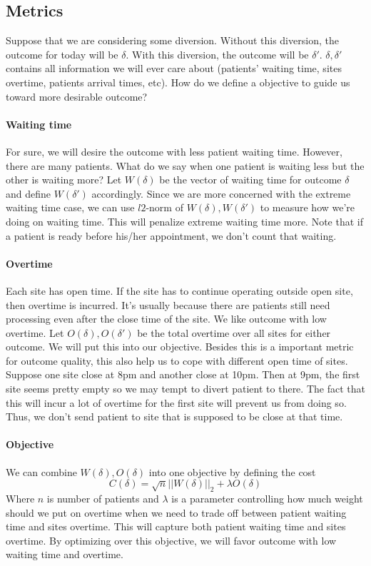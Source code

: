 \subsection{Metrics}

Suppose that we are considering some diversion. Without this diversion, the outcome for today will be $\delta$. With this diversion, the outcome will be $\delta'$. $\delta, \delta'$ contains all information we will ever care about (patients' waiting time, sites overtime, patients arrival times, etc). How do we define a objective to guide us toward more desirable outcome?

\paragraph{Waiting time} For sure, we will desire the outcome with less patient waiting time. However, there are many patients. What do we say when one patient is waiting less but the other is waiting more? Let $W(\delta)$ be the vector of waiting time for outcome $\delta$ and define $W(\delta')$ accordingly. Since we are more concerned with the extreme waiting time case, we can use $l2$-norm of $W(\delta), W(\delta')$ to measure how we're doing on waiting time. This will penalize extreme waiting time more. Note that if a patient is ready before his/her appointment, we don't count that waiting.

\paragraph{Overtime} Each site has open time. If the site has to continue operating outside open site, then overtime is incurred. It's usually because there are patients still need processing even after the close time of the site. We like outcome with low overtime. Let $O(\delta), O(\delta')$ be the total overtime over all sites for either outcome. We will put this into our objective. Besides this is a important metric for outcome quality, this also help us to cope with different open time of sites. Suppose one site close at 8pm and another close at 10pm. Then at 9pm, the first site seems pretty empty so we may tempt to divert patient to there. The fact that this will incur a lot of overtime for the first site will prevent us from doing so. Thus, we don't send patient to site that is supposed to be close at that time.

\paragraph{Objective} We can combine $W(\delta), O(\delta)$ into one objective by defining the cost
\[  C(\delta) = \sqrt{n}||W(\delta)||_2 + \lambda O(\delta) \]
Where $n$ is number of patients and $\lambda$ is a parameter controlling
how much weight should we put on overtime when we need to trade off
between patient waiting time and sites overtime.
This will capture both patient waiting time and sites overtime.
By optimizing over this objective, we will favor outcome with low waiting time and overtime.

